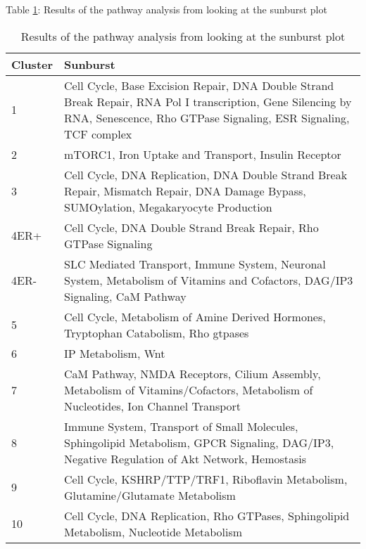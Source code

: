 \documentclass{kththesis}
\begin{document}
     \begin{table}[!ht]
          \renewcommand{\arraystretch}{1.5}
           Table \ref{Sunburst-pathways}: Results of the pathway analysis from looking at the sunburst plot

          \centering
          \begin{tabularx}{\textwidth}{lX}
               \toprule
               \bfseries Cluster & \bfseries Sunburst \\ \midrule
              1 & Cell Cycle, Base Excision Repair, DNA Double Strand Break Repair, RNA Pol I transcription, Gene Silencing by RNA, Senescence, Rho GTPase Signaling, ESR Signaling, TCF complex \\
             2 & mTORC1, Iron Uptake and Transport, Insulin Receptor \\
             3 & Cell Cycle, DNA Replication, DNA Double Strand Break Repair, Mismatch Repair, DNA Damage Bypass, SUMOylation, Megakaryocyte Production \\
             4ER+ & Cell Cycle, DNA Double Strand Break Repair, Rho GTPase Signaling \\
             4ER- & SLC Mediated Transport, Immune System, Neuronal System, Metabolism of Vitamins and Cofactors, DAG/IP3 Signaling, CaM Pathway \\
             5 & Cell Cycle, Metabolism of Amine Derived Hormones, Tryptophan Catabolism, Rho gtpases \\
             6 & IP Metabolism, Wnt \\
             7 & CaM Pathway, NMDA Receptors, Cilium Assembly, Metabolism of Vitamins/Cofactors, Metabolism of Nucleotides, Ion Channel Transport \\
             8 & Immune System, Transport of Small Molecules, Sphingolipid Metabolism, GPCR Signaling, DAG/IP3, Negative Regulation of Akt Network, Hemostasis \\
             9 & Cell Cycle, KSHRP/TTP/TRF1, Riboflavin Metabolism, Glutamine/Glutamate Metabolism \\
             10 & Cell Cycle, DNA Replication, Rho GTPases, Sphingolipid Metabolism, Nucleotide Metabolism \\ \bottomrule
     \end{tabularx}
     \caption{Results of the pathway analysis from looking at the sunburst plot}
     \label{Sunburst-pathways}
     \end{table}
\end{document}
